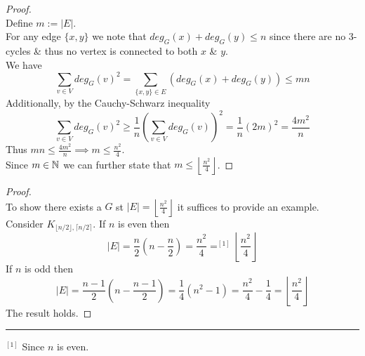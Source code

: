 \documentclass[11pt,a4paper]{article}
\begin{document}
\begin{proof}\hfill\\
Define $m:=|E|$.\\
For any edge $\{x,y\}$ we note that $deg_G(x)+deg_G(y)\leq n$ since there are no 3-cycles \& thus no vertex is connected to both $x$ \& $y$.\\
We have
$$\sum_{v\in V}deg_G(v)^2=\sum_{\{x,y\}\in E}(deg_G(x)+deg_G(y))\leq mn$$
Additionally, by the Cauchy-Schwarz inequality
$$\sum_{v\in V}deg_G(v)^2\geq\frac{1}{n}\left(\sum_{v\in V}deg_G(v)\right)^2=\frac{1}{n}(2m)^2=\frac{4m^2}{n}$$
Thus $mn\leq \frac{4m^2}{n}\implies m\leq\frac{n^2}{4}$.\\
Since $m\in\mathbb{N}$ we can further state that $m\leq\left\lfloor\frac{n^2}{4}\right\rfloor$.
\end{proof}

\begin{proof}\hfill\\
To show there exists a $G$ st $|E|=\left\lfloor\frac{n^2}{4}\right\rfloor$ it suffices to provide an example.\\
Consider $K_{\lfloor n/2\rfloor,\lceil n/2\rceil}$. If $n$ is even then
$$|E|=\frac{n}{2}\left(n-\frac{n}{2}\right)=\frac{n^2}{4}=^{[1]}\left\lfloor\frac{n^2}{4}\right\rfloor$$
If $n$ is odd then
$$|E|=\frac{n-1}{2}\left(n-\frac{n-1}{2}\right)=\frac{1}{4}(n^2-1)=\frac{n^2}{4}-\frac{1}{4}=\left\lfloor\frac{n^2}{4}\right\rfloor$$
The result holds.
\end{proof}

\par\noindent\rule{\textwidth}{0.4pt}

$^{[1]}$ Since $n$ is even.

\newpage
\end{document}

